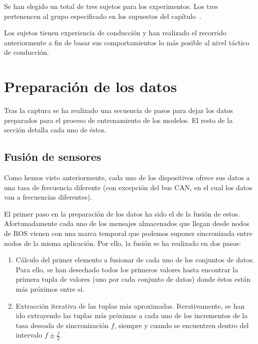 Se han elegido un total de tres sujetos para los experimentos. Los tres pertenencen al grupo especificado en los supuestos del capítulo~.

Los sujetos tienen experiencia de conducción y han realizado el recorrido anteriormente a fin de basar sus comportamientos lo más posible al nivel táctico de conducción.

\section{Preparación de los datos}

Tras la captura se ha realizado una secuencia de pasos para dejar los datos preparados para el proceso de entrenamiento de los modelos. El resto de la sección detalla cada uno de éstos.

\subsection{Fusión de sensores}

Como hemos visto anteriormente, cada uno de los dispositivos ofrece sus datos a una tasa de frecuencia diferente (con excepción del bus CAN, en el cual los datos van a frecuencias diferentes).

El primer paso en la preparación de los datos ha sido el de la fusión de estos. Afortunadamente cada uno de los mensajes almacenados que llegan desde nodos de ROS vienen con una marca temporal que podemos suponer sincronizada entre nodos de la misma aplicación. Por ello, la fusión se ha realizado en dos pasos:

\begin{enumerate}
	\item Cálculo del primer elemento a fusionar de cada uno de los conjuntos de datos. Para ello, se han desechado todos los primeros valores hasta encontrar la primera tupla de valores (uno por cada conjunto de datos) donde éstos están más próximos entre si.
	\item Extracción iterativa de las tuplas más aproximadas. Iterativamente, se han ido extrayendo las tuplas más próximas a cada uno de los incrementos de la tasa deseada de sincronización $f$, siempre y cuando se encuentren dentro del intervalo $f \pm \frac{f}{2}$.
\end{enumerate}

